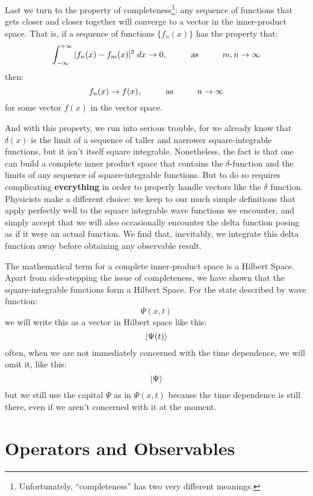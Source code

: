 \documentclass[12pt]{book}
\begin{document}
Last we turn to the property of completeness\footnote{Unfortunately, ``completeness'' has two very different meanings.}:  any sequence of functions that gets closer and closer together will converge to a vector in the inner-product space.
That is, if a sequence of functions $\{f_n(x)\}$ has the property that:
$$\int_{-\infty}^{+\infty} |f_n(x) - f_m(x)|^2 \; dx \to 0, \hspace{1cm} {\rm as} \hspace{1cm} m,n \to \infty$$
then:
$$f_n(x) \to f(x), \hspace{1cm} {\rm as} \hspace{1cm} n \to \infty$$
for some vector $f(x)$ in the vector space.

And with this property, we run into serious trouble, for we already know that $\delta(x)$ is the limit of a sequence of taller and narrower square-integrable functions, but it isn't itself square integrable.  Nonetheless, the fact is that one can build a complete inner product space that contains the $\delta$-function and the limits of any sequence of square-integrable functions.  But to do so requires complicating {\bf everything} in order to properly handle vectors like the $\delta$ function.  Physicists make a different choice: we keep to our much simple definitions that apply perfectly well to the square integrable wave functions we encounter, and simply accept that we will also occasionally encounter the delta function posing as if it were an actual function.  We find that, inevitably, we integrate this delta function away before obtaining any observable result.

The mathematical term for a complete inner-product space is a Hilbert Space.  Apart from side-stepping the issue of completeness, we have shown that the square-integrable functions form a Hilbert Space.  
For the state described by wave function:
$$\Psi(x,t)$$
we will write this as a vector in Hilbert space like this:
$$\ket{\Psi(t)}$$
often, when we are not immediately concerned with the time dependence, we will omit it, like this:
$$\ket{\Psi}$$
but we still use the capital $\Psi$ as in $\Psi(x,t)$ because the time dependence is still there, even if we aren't concerned with it at the moment.


\section{Operators and Observables}
\end{document}
